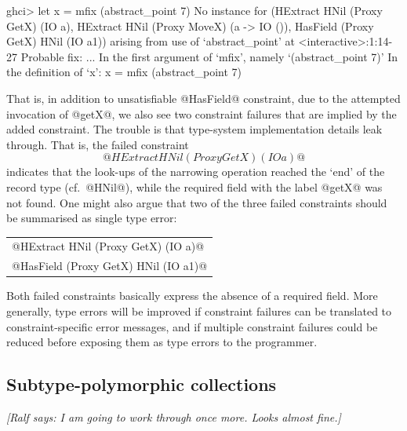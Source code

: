 \documentclass{jfp}
\newcommand{\ralf}[1]{{\it [Ralf says: #1]}}
\begin{document}
\begin{code}
 ghci> let x = mfix (abstract_point 7)
 No instance for (HExtract HNil (Proxy GetX) (IO a),
                  HExtract HNil (Proxy MoveX) (a -> IO ()),
                  HasField (Proxy GetX) HNil (IO a1))
   arising from use of `abstract_point' at <interactive>:1:14-27
 Probable fix: ...
 In the first argument of `mfix', namely `(abstract_point 7)'
 In the definition of `x': x = mfix (abstract_point 7)
\end{code}

That is, in addition to unsatisfiable @HasField@ constraint, due to
the attempted invocation of @getX@, we also see two constraint
failures that are implied by the added constraint.  The trouble is
that type-system implementation details leak through. That is, the
failed constraint
%
\[@HExtract HNil (Proxy GetX) (IO a)@\]
%
indicates that the look-ups of the narrowing operation reached the
`end' of the record type (cf.\ @HNil@), while the required field with
the label @getX@ was not found. One might also argue that two of the
three failed constraints should be summarised as single type error:
%
\begin{center}
\begin{tabular}{l}
@HExtract HNil (Proxy GetX) (IO a)@\\
@HasField (Proxy GetX) HNil (IO a1)@
\end{tabular}
\end{center}
%
Both failed constraints basically express the absence of a required
field. More generally, type errors will be improved if constraint
failures can be translated to constraint-specific error messages, and
if multiple constraint failures could be reduced before exposing them
as type errors to the programmer.






\subsection{Subtype-polymorphic collections}

\ralf{I am going to work through once more. Looks almost fine.}
\end{document}
